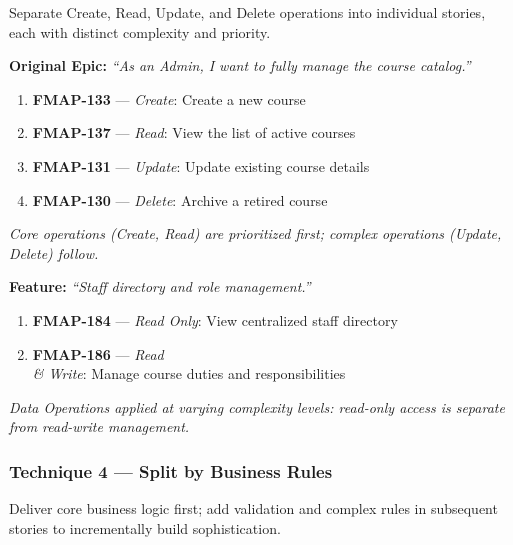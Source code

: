 \documentclass[12pt,a4paper]{article}
\begin{document}
Separate Create, Read, Update, and Delete operations into individual stories, each with distinct complexity and priority.

\vspace{6pt}
\begin{tcolorbox}[storybox,title={\textbf{Example 3a: Course Catalog (Curriculum Module)}},fonttitle=\bfseries\color{agileblue}]
\textbf{Original Epic:} \textit{``As an Admin, I want to fully manage the course catalog.''}
\vspace{4pt}
\begin{enumerate}[itemsep=2pt]
\item \textbf{FMAP-133} --- \textit{Create}: Create a new course
\item \textbf{FMAP-137} --- \textit{Read}: View the list of active courses
\item \textbf{FMAP-131} --- \textit{Update}: Update existing course details
\item \textbf{FMAP-130} --- \textit{Delete}: Archive a retired course
\end{enumerate}
\textit{Core operations (Create, Read) are prioritized first; complex operations (Update, Delete) follow.}
\end{tcolorbox}

\vspace{6pt}
\begin{tcolorbox}[storybox,title={\textbf{Example 3b: Staff Directory (Staff Module)}},fonttitle=\bfseries\color{agileblue}]
\textbf{Feature:} \textit{``Staff directory and role management.''}
\vspace{4pt}
\begin{enumerate}[itemsep=2pt]
\item \textbf{FMAP-184} --- \textit{Read Only}: View centralized staff directory
\item \textbf{FMAP-186} --- \textit{Read \\& Write}: Manage course duties and responsibilities
\end{enumerate}
\textit{Data Operations applied at varying complexity levels: read-only access is separate from read-write management.}
\end{tcolorbox}

\vspace{10pt}
\subsubsection{Technique 4 --- Split by Business Rules}

Deliver core business logic first; add validation and complex rules in subsequent stories to incrementally build sophistication.
\end{document}
